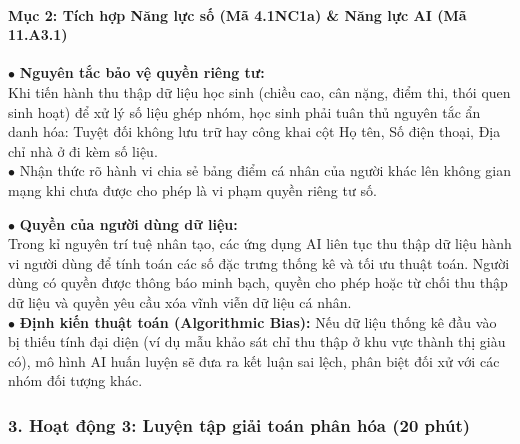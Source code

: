 \documentclass[12pt, a4paper]{article}
\begin{document}
\paragraph{Mục 2: Tích hợp Năng lực số (Mã 4.1NC1a) \& Năng lực AI (Mã 11.A3.1)}

\begin{pedabox}
    $\bullet$ \textbf{Nguyên tắc bảo vệ quyền riêng tư:}\\
    Khi tiến hành thu thập dữ liệu học sinh (chiều cao, cân nặng, điểm thi, thói quen sinh hoạt) để xử lý số liệu ghép nhóm, học sinh phải tuân thủ nguyên tắc ẩn danh hóa: Tuyệt đối không lưu trữ hay công khai cột Họ tên, Số điện thoại, Địa chỉ nhà ở đi kèm số liệu.\\
    $\bullet$ Nhận thức rõ hành vi chia sẻ bảng điểm cá nhân của người khác lên không gian mạng khi chưa được cho phép là vi phạm quyền riêng tư số.
\end{pedabox}

\begin{aibox}
    $\bullet$ \textbf{Quyền của người dùng dữ liệu:}\\
    Trong kỉ nguyên trí tuệ nhân tạo, các ứng dụng AI liên tục thu thập dữ liệu hành vi người dùng để tính toán các số đặc trưng thống kê và tối ưu thuật toán. Người dùng có quyền được thông báo minh bạch, quyền cho phép hoặc từ chối thu thập dữ liệu và quyền yêu cầu xóa vĩnh viễn dữ liệu cá nhân.\\
    $\bullet$ \textbf{Định kiến thuật toán (Algorithmic Bias):} Nếu dữ liệu thống kê đầu vào bị thiếu tính đại diện (ví dụ mẫu khảo sát chỉ thu thập ở khu vực thành thị giàu có), mô hình AI huấn luyện sẽ đưa ra kết luận sai lệch, phân biệt đối xử với các nhóm đối tượng khác.
\end{aibox}

\subsubsection*{3. Hoạt động 3: Luyện tập giải toán phân hóa (20 phút)}
\end{document}
